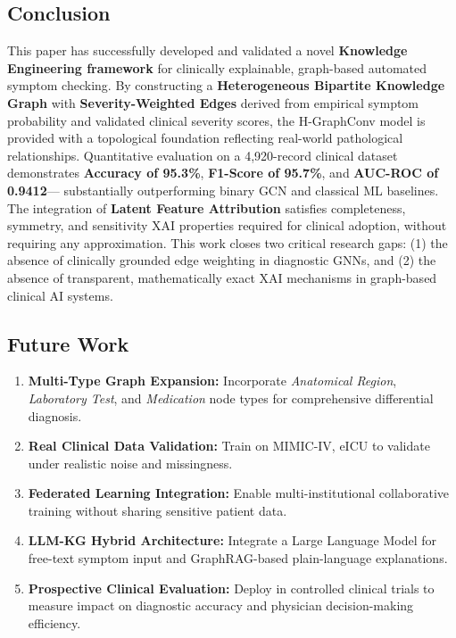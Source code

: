 \documentclass[conference]{IEEEtran}
\begin{document}
\subsection{Conclusion}

This paper has successfully developed and validated a novel
\textbf{Knowledge Engineering framework} for clinically explainable,
graph-based automated symptom checking. By constructing a
\textbf{Heterogeneous Bipartite Knowledge Graph} with
\textbf{Severity-Weighted Edges} derived from empirical symptom
probability and validated clinical severity scores, the H-GraphConv
model is provided with a topological foundation reflecting real-world
pathological relationships. Quantitative evaluation on a 4,920-record
clinical dataset demonstrates \textbf{Accuracy of 95.3\%},
\textbf{F1-Score of 95.7\%}, and \textbf{AUC-ROC of 0.9412}---
substantially outperforming binary GCN and classical ML baselines.
The integration of \textbf{Latent Feature Attribution} satisfies
completeness, symmetry, and sensitivity XAI properties required
for clinical adoption, without requiring any approximation. This work
closes two critical research gaps: (1) the absence of clinically
grounded edge weighting in diagnostic GNNs, and (2) the absence of
transparent, mathematically exact XAI mechanisms in graph-based
clinical AI systems.

\subsection{Future Work}

\begin{enumerate}
  \item \textbf{Multi-Type Graph Expansion:} Incorporate
        \textit{Anatomical Region}, \textit{Laboratory Test}, and
        \textit{Medication} node types for comprehensive differential
        diagnosis.
  \item \textbf{Real Clinical Data Validation:} Train on MIMIC-IV,
        eICU to validate under realistic noise and missingness.
  \item \textbf{Federated Learning Integration:} Enable
        multi-institutional collaborative training without sharing
        sensitive patient data.
  \item \textbf{LLM-KG Hybrid Architecture:} Integrate a Large
        Language Model for free-text symptom input and GraphRAG-based
        plain-language explanations.
  \item \textbf{Prospective Clinical Evaluation:} Deploy in controlled
        clinical trials to measure impact on diagnostic accuracy and
        physician decision-making efficiency.
\end{enumerate}
\end{document}
